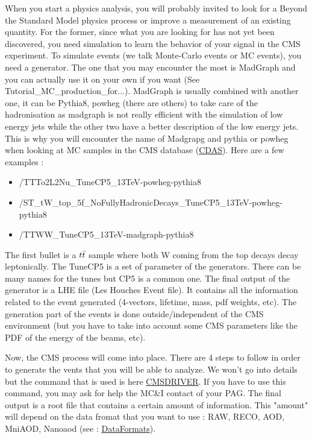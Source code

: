 \documentclass[reprint, a4paper, nofootinbib, amsmath, amssymb, aps]{revtex4-1}
\begin{document}
    When you start a physics analysis, you will probably invited to look for a Beyond the Standard Model physics process or improve a measurement of an existing quantity. For the former, since what you are looking for has not yet been discovered, you need simulation to learn the behavior of your signal in the CMS experiment. To simulate events (we talk Monte-Carlo events or MC events), you need a generator. The one that you may encounter the most is MadGraph and you can actually use it on your own if you want (See Tutorial\_MC\_production\_for...). MadGraph is usually combined with another one, it can be Pythia8, powheg (there are others) to take care of the hadronisation as madgraph is not really efficient with the simulation of low energy jets while the other two have a better description of the low energy jets.  This is why you will encounter the name of Madgrapg and pythia or powheg when looking at MC samples in the CMS database (\href{https://cmsweb.cern.ch/das/}{CDAS}). Here are a few examples :\begin{itemize}
        \item /TTTo2L2Nu\_TuneCP5\_13TeV-powheg-pythia8
        \item /ST\_tW\_top\_5f\_NoFullyHadronicDecays\_TuneCP5\_13TeV-powheg-pythia8
        \item /TTWW\_TuneCP5\_13TeV-madgraph-pythia8
    \end{itemize}
    The first bullet is a $t\Bar{t}$ sample where both W coming from the top decays decay leptonically. The TuneCP5 is a set of parameter of the generators. There can be many names for the tunes but CP5 is a common one. The final output of the generator is a LHE file (Les Houches Event file). It contains all the information related to the event generated (4-vectors, lifetime, mass, pdf weights, etc). The generation part of the events is done outside/independent of the CMS environment (but you have to take into account some CMS parameters like the PDF of the energy of the beams, etc).

    Now, the CMS process will come into place. There are 4 steps to follow in order to generate the vents that you will be able to analyze.    
    We won't go into details but the command that is used is here \href{https://twiki.cern.ch/twiki/bin/view/CMSPublic/SWGuideCmsDriver}{CMSDRIVER}. If you have to use this command, you may ask for help the MC\&I contact of your PAG. The final output is a root file that contains a certain amount of information. This "amount" will depend on the data fromat that you want to use : RAW, RECO, AOD, MniAOD, Nanoaod (see : \href{https://twiki.cern.ch/twiki/bin/view/CMSPublic/WorkBookAnalysisOverviewIntroduction}{DataFormats}). 
 
\end{document}
